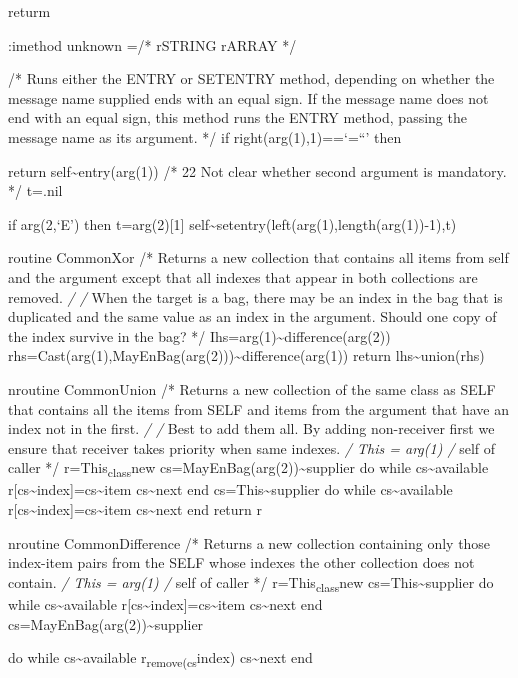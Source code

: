 returm

:imethod unknown =/* rSTRING rARRAY */

/* Runs either the ENTRY or SETENTRY method, depending on whether the
message name supplied ends with an equal sign. If the message name does
not end with an equal sign, this method runs the ENTRY method, passing
the message name as its argument. */ if right(arg(1),1)==`=``' then

return self\textasciitilde entry(arg(1)) /* 22 Not clear whether second
argument is mandatory. */ t=.nil

if arg(2,`E') then t=arg(2){[}1{]}
self\textasciitilde setentry(left(arg(1),length(arg(1))-1),t)

routine CommonXor /* Returns a new collection that contains all items
from self and the argument except that all indexes that appear in both
collections are removed. \emph{/ /} When the target is a bag, there may
be an index in the bag that is duplicated and the same value as an index
in the argument. Should one copy of the index survive in the bag? */
Ihs=arg(1)\textasciitilde difference(arg(2))
rhs=Cast(arg(1),MayEnBag(arg(2)))\textasciitilde difference(arg(1))
return lhs\textasciitilde union(rhs)

nroutine CommonUnion /* Returns a new collection of the same class as
SELF that contains all the items from SELF and items from the argument
that have an index not in the first. \emph{/ /} Best to add them all. By
adding non-receiver first we ensure that receiver takes priority when
same indexes. \emph{/ This = arg(1) /} self of caller */
r=This\textsubscript{class}new
cs=MayEnBag(arg(2))\textasciitilde supplier do while
cs\textasciitilde available
r{[}cs\textasciitilde index{]}=cs\textasciitilde item
cs\textasciitilde next end cs=This\textasciitilde supplier do while
cs\textasciitilde available
r{[}cs\textasciitilde index{]}=cs\textasciitilde item
cs\textasciitilde next end return r

nroutine CommonDifference /* Returns a new collection containing only
those index-item pairs from the SELF whose indexes the other collection
does not contain. \emph{/ This = arg(1) /} self of caller */
r=This\textsubscript{class}new cs=This\textasciitilde supplier do while
cs\textasciitilde available
r{[}cs\textasciitilde index{]}=cs\textasciitilde item
cs\textasciitilde next end cs=MayEnBag(arg(2))\textasciitilde supplier

do while cs\textasciitilde available r\textsubscript{remove(cs}index)
cs\textasciitilde next end

